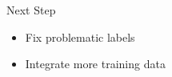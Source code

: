 \begin{frame}{Next Step}
   \begin{itemize}
      \item Fix problematic labels
      \item Integrate more training data 
   \end{itemize}
    

 \end{frame}



